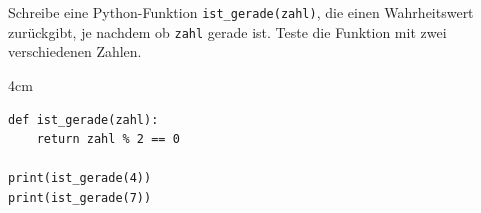 \question[3]
Schreibe eine Python-Funktion \texttt{ist\_gerade(zahl)}, die einen Wahrheitswert zurückgibt,
je nachdem ob \texttt{zahl} gerade ist. Teste die Funktion mit zwei verschiedenen Zahlen.

\begin{solutionbox}{4cm}
\begin{lstlisting}
def ist_gerade(zahl):
    return zahl % 2 == 0

print(ist_gerade(4))
print(ist_gerade(7))
\end{lstlisting}
\end{solutionbox}
